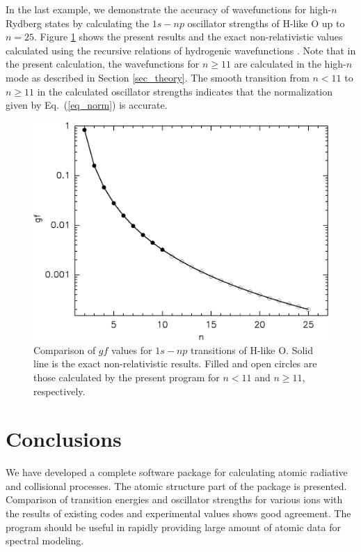 \documentclass[preprint, floatfix, pra, showpacs, showkeys]{revtex4}
\begin{document}
In the last example, we demonstrate the accuracy of wavefunctions for
high-$n$ Rydberg states by calculating the $1s-np$ oscillator strengths of
H-like O up to $n=25$. Figure \ref{fig_o01} shows the present results and the
exact 
non-relativistic values calculated using the recursive relations of hydrogenic
wavefunctions \cite{storey91}. Note that in the present calculation, the
wavefunctions for 
$n\ge 11$ are calculated in the high-$n$ mode as described in Section
\ref{sec_theory}. The smooth transition from $n < 11$ to $n\ge 11$ in the
calculated oscillator strengths indicates that the normalization given by
Eq.~(\ref{eq_norm}) is accurate. 
\begin{figure}
\caption{\label{fig_o01}Comparison of $gf$ values for $1s-np$ transitions of
H-like O. Solid line is the exact non-relativistic results. Filled and open
circles are those calculated by the present program for $n < 11$ and $n \ge
11$, respectively.}
\includegraphics[width=5in]{tr.eps}
\end{figure}

\section{Conclusions}
\label{sec_conclusions}
We have developed a complete software package for calculating atomic radiative
and collisional processes. The atomic structure part of the package is
presented. Comparison of transition energies and oscillator strengths for
various ions with the results of existing codes and experimental
values shows good agreement. The program should be useful in rapidly providing
large amount of atomic data for spectral modeling.
\end{document}
